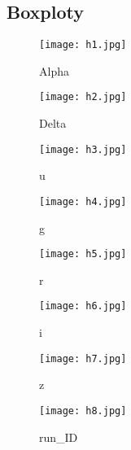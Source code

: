 \documentclass{article}
\begin{document}
\subsection{Boxploty}
\begin{figure}[H]
  \centering
  \begin{minipage}{0.49\textwidth}
    \centering
    \texttt{[image: h1.jpg]}
    \caption{Alpha}
    \label{fig:image1}
  \end{minipage}\hfill
  \begin{minipage}{0.49\textwidth}
    \centering
    \texttt{[image: h2.jpg]}
    \caption{Delta}
    \label{fig:image2}
  \end{minipage}

  \vspace{1em}

  \begin{minipage}{0.49\textwidth}
    \centering
    \texttt{[image: h3.jpg]}
    \caption{u}
    \label{fig:image3}
  \end{minipage}\hfill
  \begin{minipage}{0.49\textwidth}
    \centering
    \texttt{[image: h4.jpg]}
    \caption{g}
    \label{fig:image4}
  \end{minipage}

  \vspace{1em}

  \begin{minipage}{0.49\textwidth}
    \centering
    \texttt{[image: h5.jpg]}
    \caption{r}
    \label{fig:image5}
  \end{minipage}\hfill
  \begin{minipage}{0.49\textwidth}
    \centering
    \texttt{[image: h6.jpg]}
    \caption{i}
    \label{fig:image6}
  \end{minipage}

  \vspace{1em}

  \begin{minipage}{0.49\textwidth}
    \centering
    \texttt{[image: h7.jpg]}
    \caption{z}
    \label{fig:image7}
  \end{minipage}\hfill
  \begin{minipage}{0.49\textwidth}
    \centering
    \texttt{[image: h8.jpg]}
    \caption{run\_ID}
    \label{fig:image8}
  \end{minipage}
\end{figure}
\end{document}
